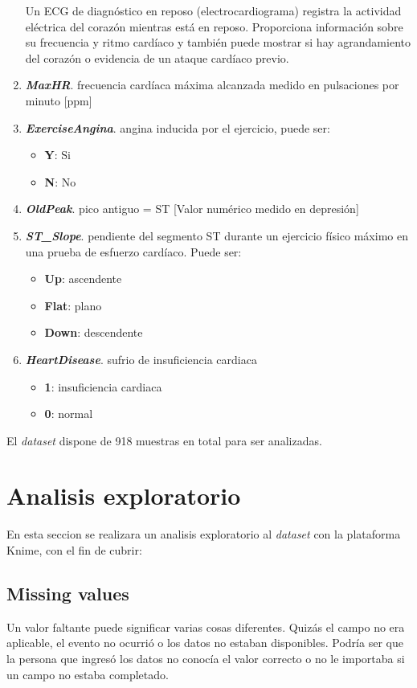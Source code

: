 \documentclass[12pt, letterpaper]{article}
\begin{document}
\begin{enumerate}
{    Un ECG de diagnóstico en reposo (electrocardiograma) registra la actividad eléctrica 
    del corazón mientras está en reposo. Proporciona información sobre su frecuencia y 
    ritmo cardíaco y también puede mostrar si hay agrandamiento del corazón o 
    evidencia de un ataque cardíaco previo. \cite{electrocardiograma}
    } 
    \item{\textbf{\textit{MaxHR}}. frecuencia cardíaca máxima alcanzada
    medido en pulsaciones por minuto [ppm]}
    \item{\textbf{\textit{ExerciseAngina}}. angina inducida por el ejercicio, puede ser:
    \begin{itemize}
        \item{\textbf{Y}}: Si
        \item{\textbf{N}}: No
    \end{itemize}
    }
    \item{\textbf{\textit{OldPeak}}. pico antiguo = ST [Valor numérico medido en depresión]}
    \item{\textbf{\textit{ST\_Slope}}. pendiente del segmento ST 
    durante un ejercicio físico máximo en una prueba de 
    esfuerzo cardíaco. Puede ser:
    \begin{itemize}
        \item{\textbf{Up}}: ascendente
        \item{\textbf{Flat}}: plano
        \item{\textbf{Down}}: descendente
    \end{itemize}
    }
    \item{\textbf{\textit{HeartDisease}}. sufrio de insuficiencia cardiaca
    \begin{itemize}
        \item{\textbf{1}}: insuficiencia cardiaca
        \item{\textbf{0}}: normal
    \end{itemize}
    }
\end{enumerate}
El \textit{dataset} dispone de 918 muestras en total para ser analizadas.
\section{Analisis exploratorio}
En esta seccion se realizara un analisis exploratorio al \textit{dataset} 
con la plataforma Knime, con el fin de cubrir:

\subsection{Missing values}
Un valor faltante puede significar varias cosas diferentes. 
Quizás el campo no era aplicable, el evento no ocurrió o los datos no estaban disponibles. 
Podría ser que la persona que ingresó los datos no conocía el valor correcto o no le importaba 
si un campo no estaba completado. \cite{missin_values}
\end{document}
